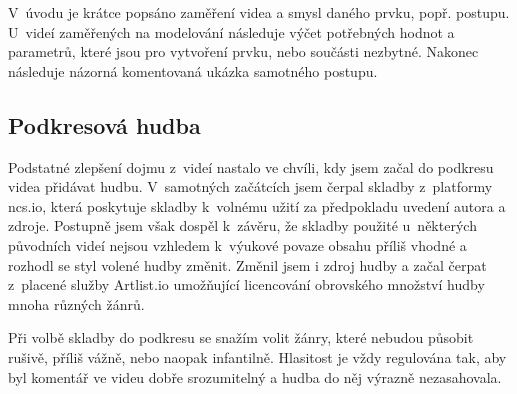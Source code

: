 V~úvodu je krátce popsáno zaměření videa a smysl daného prvku, popř. postupu.
U~videí zaměřených na modelování následuje výčet potřebných hodnot a parametrů, které jsou pro vytvoření prvku, nebo součásti nezbytné.
Nakonec následuje názorná komentovaná ukázka samotného postupu.

\subsection{Podkresová hudba}
Podstatné zlepšení dojmu z~videí nastalo ve chvíli, kdy jsem začal do podkresu videa přidávat hudbu.
V~samotných začátcích jsem čerpal skladby z~platformy ncs.io, která poskytuje skladby k~volnému užití za předpokladu uvedení autora a zdroje.
Postupně jsem však dospěl k~závěru, že skladby použité u~některých původních videí nejsou vzhledem k~výukové povaze obsahu příliš vhodné a rozhodl se styl volené hudby změnit. 
Změnil jsem i zdroj hudby a začal čerpat z~placené služby Artlist.io umožňující licencování obrovského množství hudby mnoha různých žánrů.

Při volbě skladby do podkresu se snažím volit žánry, které nebudou působit rušivě, příliš vážně, nebo naopak infantilně.
Hlasitost je vždy regulována tak, aby byl komentář ve videu dobře srozumitelný a hudba do něj výrazně nezasahovala.

